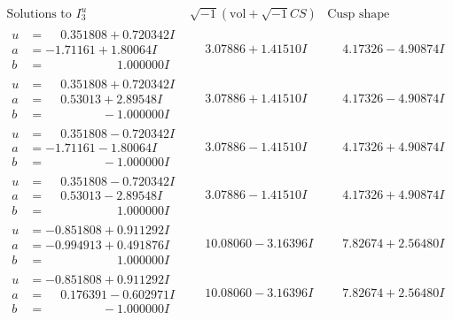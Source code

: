 \documentclass[1p]{elsarticle_modified}
\theoremstyle{definition}
\newcommand{\I}{\sqrt{-1}}
\begin{document}
$$\begin{array}{c|c|c}  
\text{Solutions to }I^u_{3}& \I (\text{vol} + \sqrt{-1}CS) & \text{Cusp shape}\\
 \hline 
\begin{aligned}
u &= \phantom{-}0.351808 + 0.720342 I \\
a &= -1.71161 + 1.80064 I \\
b &= \phantom{-0.000000 -}1.000000 I\end{aligned}
 & \phantom{-}3.07886 + 1.41510 I & \phantom{-}4.17326 - 4.90874 I \\ \hline\begin{aligned}
u &= \phantom{-}0.351808 + 0.720342 I \\
a &= \phantom{-}0.53013 + 2.89548 I \\
b &= \phantom{-0.000000 } -1.000000 I\end{aligned}
 & \phantom{-}3.07886 + 1.41510 I & \phantom{-}4.17326 - 4.90874 I \\ \hline\begin{aligned}
u &= \phantom{-}0.351808 - 0.720342 I \\
a &= -1.71161 - 1.80064 I \\
b &= \phantom{-0.000000 } -1.000000 I\end{aligned}
 & \phantom{-}3.07886 - 1.41510 I & \phantom{-}4.17326 + 4.90874 I \\ \hline\begin{aligned}
u &= \phantom{-}0.351808 - 0.720342 I \\
a &= \phantom{-}0.53013 - 2.89548 I \\
b &= \phantom{-0.000000 -}1.000000 I\end{aligned}
 & \phantom{-}3.07886 - 1.41510 I & \phantom{-}4.17326 + 4.90874 I \\ \hline\begin{aligned}
u &= -0.851808 + 0.911292 I \\
a &= -0.994913 + 0.491876 I \\
b &= \phantom{-0.000000 -}1.000000 I\end{aligned}
 & \phantom{-}10.08060 - 3.16396 I & \phantom{-}7.82674 + 2.56480 I \\ \hline\begin{aligned}
u &= -0.851808 + 0.911292 I \\
a &= \phantom{-}0.176391 - 0.602971 I \\
b &= \phantom{-0.000000 } -1.000000 I\end{aligned}
 & \phantom{-}10.08060 - 3.16396 I & \phantom{-}7.82674 + 2.56480 I \\ \hline\begin{aligned}

\end{aligned}
\end{array}$$
\end{document}
